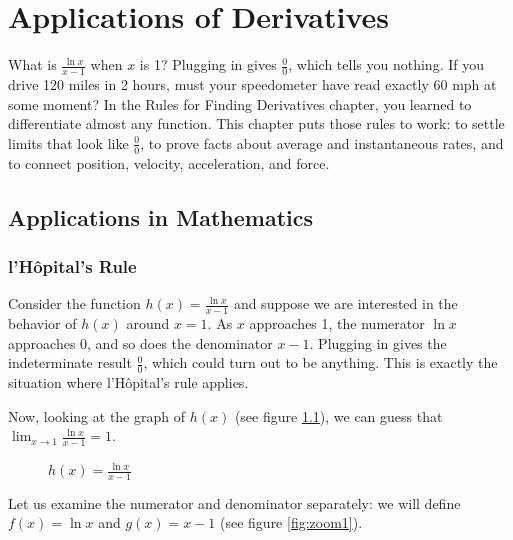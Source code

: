 \chapter{Applications of Derivatives}

What is $\frac{\ln x}{x - 1}$ when $x$ is 1? Plugging in gives $\frac{0}{0}$, which tells you nothing. If you
drive 120 miles in 2 hours, must your speedometer have read exactly 60 mph at some moment? In the Rules for
Finding Derivatives chapter, you learned to differentiate almost any function. This chapter puts those rules
to work: to settle limits that look like $\frac{0}{0}$, to prove facts about average and instantaneous rates,
and to connect position, velocity, acceleration, and force.

\section{Applications in Mathematics}
\subsection{l'H\^{o}pital's Rule}
Consider the function $h(x) = \frac{\ln{x}}{x-1}$ and suppose we are interested 
in the behavior of $h(x)$ around $x=1$. As $x$ approaches 1, the numerator
$\ln{x}$ approaches 0, and so does the denominator $x-1$. Plugging in gives
the indeterminate result $\frac{0}{0}$, which could
turn out to be anything. This is exactly the situation where l'H\^{o}pital's
rule applies.

Now, looking at the graph of $h(x)$ (see figure \ref{fig:lhospital}), we can guess 
that $\lim_{x \to 1} \frac{\ln{x}}{x-1} = 1$. 

\begin{figure}[H]
\centering
{}
\caption{$h(x) = \frac{\ln{x}}{x - 1}$}
\label{fig:lhospital}
\end{figure}

Let us examine the numerator and denominator separately: we will define $f(x) = 
\ln{x}$ and $g(x) = x - 1$ (see figure \ref{fig:zoom1}). 


